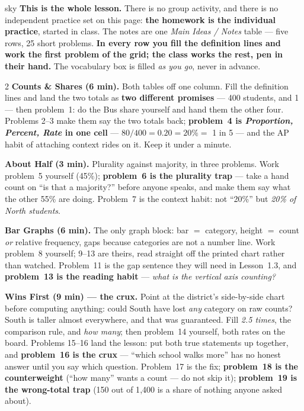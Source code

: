 \documentclass[10pt]{article}
\begin{document}
\boxguard
\begin{skillbox}{sky}
\textbf{This is the whole lesson.} There is no group activity, and there is no independent
practice set on this page: \textbf{the homework is the individual practice}, started in class.
The notes are one \emph{Main Ideas / Notes} table --- five rows, 25 short problems. \textbf{In
every row you fill the definition lines and work the first problem of the grid; the class works
the rest, pen in their hand.} The vocabulary box is filled \emph{as you go}, never in advance.
\begin{multicols}{2}
\textbf{Counts \& Shares (6 min).} Both tables off one column. Fill the definition lines and land
the two totals as \textbf{two different promises} --- 400 students, and 1 --- then problem~1: do
the Bus share yourself and hand them the other four. Problems 2--3 make them say the two totals
back; \textbf{problem~4 is \emph{Proportion, Percent, Rate} in one cell} --- $80/400 = 0.20 =
20\% = $ 1 in 5 --- and the AP habit of attaching context rides on it. Keep it under a minute.

\textbf{About Half (3 min).} Plurality against majority, in three problems. Work problem~5 yourself
(45\%); \textbf{problem~6 is the plurality trap} --- take a hand count on ``is that a majority?''
before anyone speaks, and make them say what the other 55\% are doing. Problem~7 is the context
habit: not ``20\%'' but \emph{20\% of North students}.

\textbf{Bar Graphs (6 min).} The only graph block: bar $=$ category, height $=$ count \emph{or}
relative frequency, gaps because categories are not a number line. Work problem~8 yourself; 9--13
are theirs, read straight off the printed chart rather than watched. Problem~11 is the gap
sentence they will need in Lesson~1.3, and \textbf{problem~13 is the reading habit} --- \emph{what
is the vertical axis counting?}

\textbf{Wins First (9 min) --- the crux.} Point at the district's side-by-side chart before
computing anything: could South have lost \emph{any} category on raw counts? South is taller
almost everywhere, and that was guaranteed. Fill \emph{2.5 times}, the comparison rule, and
\emph{how many}; then problem~14 yourself, both rates on the board. Problems 15--16 land the
lesson: put both true statements up together, and \textbf{problem~16 is the crux} --- ``which
school walks more'' has no honest answer until you say which question. Problem~17 is the fix;
\textbf{problem~18 is the counterweight} (``how many'' wants a count --- do not skip it);
\textbf{problem~19 is the wrong-total trap} (150 out of 1{,}400 is a share of nothing anyone
asked about).


\end{multicols}
\end{skillbox}
\end{document}
